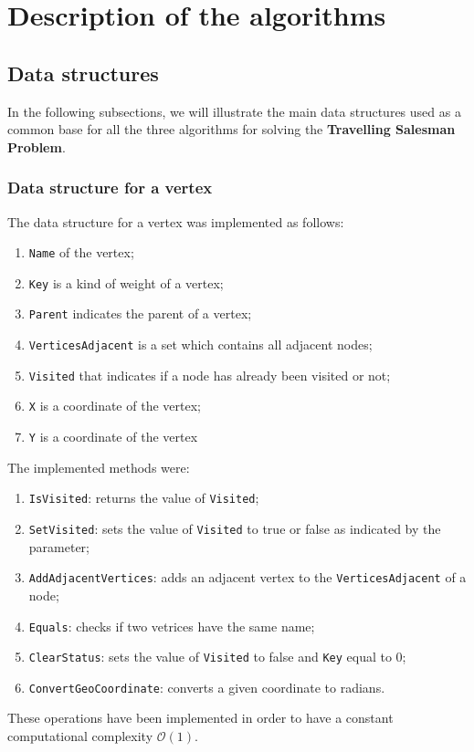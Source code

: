 \section{Description of the algorithms}

\subsection{Data structures}
In the following subsections, we will illustrate the main data structures used as a common base for all the 
three algorithms for solving the \textbf{Travelling Salesman Problem}.

\subsubsection{Data structure for a vertex}
The data structure for a vertex was implemented as follows:
\begin{enumerate}
    \item \verb|Name| of the vertex;
    \item \verb|Key| is a kind of weight of a vertex;
    \item \verb|Parent| indicates the parent of a vertex;
    \item \verb|VerticesAdjacent| is a set which contains all adjacent nodes; 
    \item \verb|Visited| that indicates if a node has already been visited or not;
    \item \verb|X| is a coordinate of the vertex;
    \item \verb|Y| is a coordinate of the vertex
\end{enumerate}
\noindent
The implemented methods were:
\begin{enumerate}
    \item \verb|IsVisited|: returns the value of \verb|Visited|;
    \item \verb|SetVisited|: sets the value of \verb|Visited| to true or false as indicated by the parameter;
    \item \verb|AddAdjacentVertices|: adds an adjacent vertex to the \verb|VerticesAdjacent| of a node;
    \item \verb|Equals|: checks if two vetrices have the same name;
    \item \verb|ClearStatus|: sets the value of \verb|Visited| to false and \verb|Key| equal to 0;
    \item \verb|ConvertGeoCoordinate|: converts a given coordinate to radians.
\end{enumerate}
These operations have been implemented in order to have a constant computational complexity $\mathcal{O}(1)$.

